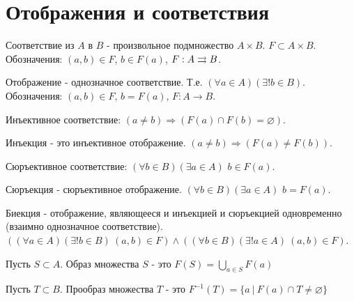 \section{Отображения и соответствия}

\begin{definition}
	Соответствие из $A$ в $B$ - произвольное подмножество $A \times B$. $F \subset A \times B$. Обозначения: $(a, b) \in F$, $b \in F(a)$, $F: A \rightrightarrows B$.
\end{definition}

\begin{definition}
	Отображение - однозначное соответствие. Т.е. $(\forall a \in A) (\exists! b \in B)$. Обозначения: $(a, b) \in F$, $b = F(a)$, $F: A \rightarrow B$. 
\end{definition}

\begin{definition}
	Инъективное соответствие: $(a \neq b) \Rightarrow (F(a) \cap F(b) = \varnothing)$.
\end{definition}

\begin{definition}
	Инъекция - это инъективное отображение. $(a \neq b) \Rightarrow (F(a) \neq F(b))$.
\end{definition}

\begin{definition}
	Сюръективное соответствие: $(\forall b \in B) (\exists a \in A)$ $b \in F(a)$.
\end{definition}

\begin{definition}
	Сюръекция - сюръективное отображение. $(\forall b \in B) (\exists a \in A)$ $b = F(a)$.
\end{definition}

\begin{definition}
	Биекция - отображение, являющееся и инъекцией и сюръекцией одновременно (взаимно однозначное соответствие). $((\forall a \in A) (\exists! b \in B) \ (a, b) \in F) \land ((\forall b \in B) (\exists! a \in A) \ (a, b) \in F)$.
\end{definition}

\begin{definition}
	Пусть $S \subset A$. Образ множества $S$ - это $F(S) = \bigcup\limits_{a \in S} F(a)$
\end{definition}

\begin{definition}
	Пусть $T \subset B$. Прообраз множества $T$ - это $F^{-1}(T) = \{a \ | \ F(a) \cap T \neq \varnothing\}$
\end{definition}


